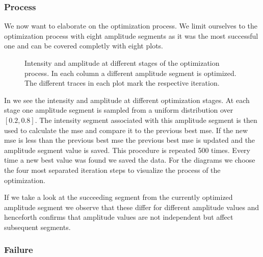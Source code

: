 \subsubsection{Process}

We now want to elaborate on the optimization process. We limit ourselves to
the optimization process with eight amplitude segments as it was the most
successful one and can be covered completly with eight plots.
\begin{figure}[htb]
  \centering
  \begin{adjustbox}{width=\textwidth}
  \end{adjustbox}
  \caption{Intensity and amplitude at different stages of the optimization
    process. In each column a different amplitude segment is optimized.
    The different traces in each plot mark the respective iteration.
  }\label{fig:intensity_optimization_process}
\end{figure}
In  we see the intensity and
amplitude at different optimization stages. At each stage one amplitude
segment is sampled from a uniform distribution over $[0.2,0.8]$. The intensity
segment associated with this amplitude segment is then used to calculate
the \gls{mse} and compare it to the previous best \gls{mse}. If the new
\gls{mse} is less than the previous best \gls{mse} the previous best \gls{mse}
is updated and the amplitude segment value is saved. This procedure is
repeated \num{500} times. Every time a new best value was found we saved the
data. For the diagrams we choose the four most separated iteration steps to
visualize the process of the optimization.

If we take a look at the succeeding segment from the currently optimized
amplitude segment we observe that these differ for different amplitude
values and henceforth confirms that amplitude values are not independent but
affect subsequent segments.

\subsubsection{Failure}


